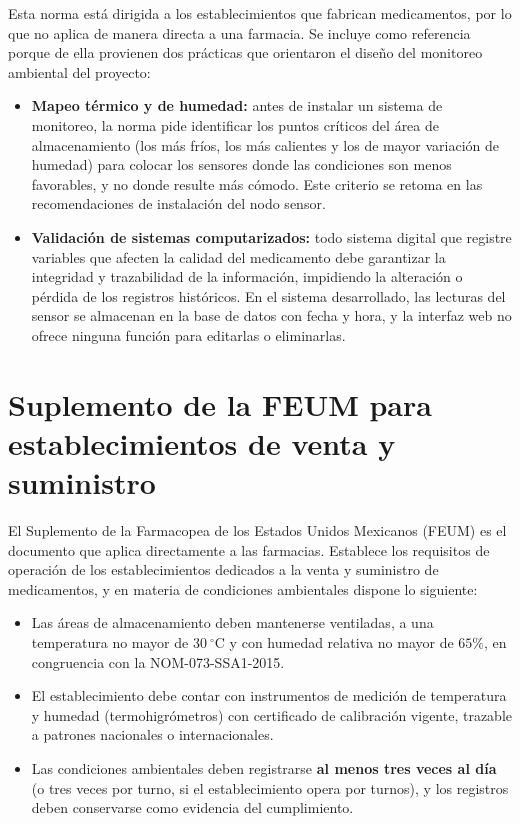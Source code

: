 Esta norma \cite{nom059} está dirigida a los establecimientos que fabrican medicamentos, por lo que no aplica de manera directa a una farmacia. Se incluye como referencia porque de ella provienen dos prácticas que orientaron el diseño del monitoreo ambiental del proyecto:

\begin{itemize}
    \item \textbf{Mapeo térmico y de humedad:} antes de instalar un sistema de monitoreo, la norma pide identificar los puntos críticos del área de almacenamiento (los más fríos, los más calientes y los de mayor variación de humedad) para colocar los sensores donde las condiciones son menos favorables, y no donde resulte más cómodo. Este criterio se retoma en las recomendaciones de instalación del nodo sensor.

    \item \textbf{Validación de sistemas computarizados:} todo sistema digital que registre variables que afecten la calidad del medicamento debe garantizar la integridad y trazabilidad de la información, impidiendo la alteración o pérdida de los registros históricos. En el sistema desarrollado, las lecturas del sensor se almacenan en la base de datos con fecha y hora, y la interfaz web no ofrece ninguna función para editarlas o eliminarlas.
\end{itemize}

\section{Suplemento de la FEUM para establecimientos de venta y suministro}

El Suplemento de la Farmacopea de los Estados Unidos Mexicanos (FEUM) \cite{feum-suplemento} es el documento que aplica directamente a las farmacias. Establece los requisitos de operación de los establecimientos dedicados a la venta y suministro de medicamentos, y en materia de condiciones ambientales dispone lo siguiente:

\begin{itemize}
    \item Las áreas de almacenamiento deben mantenerse ventiladas, a una temperatura no mayor de $30~^{\circ}\text{C}$ y con humedad relativa no mayor de $65\%$, en congruencia con la NOM-073-SSA1-2015.

    \item El establecimiento debe contar con instrumentos de medición de temperatura y humedad (termohigrómetros) con certificado de calibración vigente, trazable a patrones nacionales o internacionales.

    \item Las condiciones ambientales deben registrarse \textbf{al menos tres veces al día} (o tres veces por turno, si el establecimiento opera por turnos), y los registros deben conservarse como evidencia del cumplimiento.
\end{itemize}

